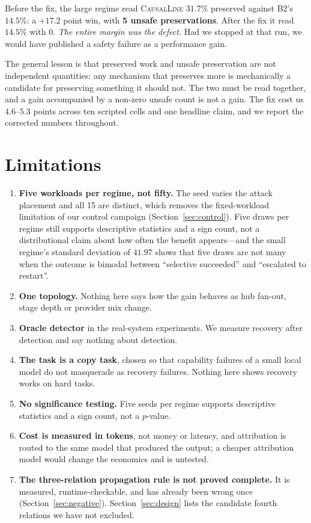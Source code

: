\documentclass[10pt,twocolumn]{article}
\newcommand{\sys}{\textsc{CausalLine}}
\newcommand{\btwo}{\textsf{B2}}
\begin{document}
Before the fix, the large regime read \sys{} $31.7\%$ preserved against
\btwo{}'s $14.5\%$: a $+17.2$ point win, with \textbf{5 unsafe
preservations}. After the fix it read $14.5\%$ with $0$. \emph{The entire
margin was the defect.} Had we stopped at that run, we would have published a
safety failure as a performance gain.

The general lesson is that preserved work and unsafe preservation are not
independent quantities: any mechanism that preserves more is mechanically a
candidate for preserving something it should not. The two must be read
together, and a gain accompanied by a non-zero unsafe count is not a gain. The
fix cost us $4.6$--$5.3$ points across ten scripted cells and one headline
claim, and we report the corrected numbers throughout.

\section{Limitations}

\begin{enumerate}
\itemsep2pt
\item \textbf{Five workloads per regime, not fifty.} The seed varies the attack
placement and all 15 are distinct, which removes the fixed-workload limitation
of our control campaign (Section~\ref{sec:control}). Five draws per regime
still supports descriptive statistics and a sign count, not a distributional
claim about how often the benefit appears---and the small regime's standard
deviation of $41.97$ shows that five draws are not many when the outcome is
bimodal between ``selective succeeded'' and ``escalated to restart''.
\item \textbf{One topology.} Nothing here says how the gain behaves as hub
fan-out, stage depth or provider mix change.
\item \textbf{Oracle detector} in the real-system experiments. We measure
recovery after detection and say nothing about detection.
\item \textbf{The task is a copy task}, chosen so that capability failures of
a small local model do not masquerade as recovery failures. Nothing here shows
recovery works on hard tasks.
\item \textbf{No significance testing.} Five seeds per regime supports
descriptive statistics and a sign count, not a $p$-value.
\item \textbf{Cost is measured in tokens}, not money or latency, and
attribution is routed to the same model that produced the output; a cheaper
attribution model would change the economics and is untested.
\item \textbf{The three-relation propagation rule is not proved complete.}
It is measured, runtime-checkable, and has already been wrong once
(Section~\ref{sec:negative}). Section~\ref{sec:design} lists the candidate
fourth relations we have not excluded.
\end{enumerate}
\end{document}
